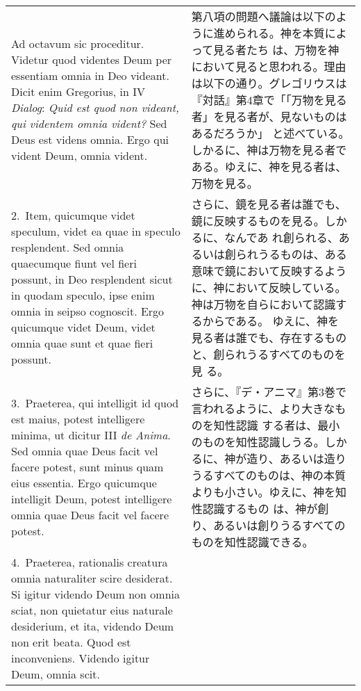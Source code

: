 \documentclass[10pt]{jsarticle} %
\begin{document}
\begin{longtable}{p{21em}p{21em}}

{\sc Ad octavum sic proceditur}. Videtur quod videntes Deum per
essentiam omnia in Deo videant. Dicit enim Gregorius, in IV {\it
Dialog}: {\it Quid est quod non videant, qui videntem omnia vident?}
Sed Deus est videns omnia. Ergo qui vident Deum, omnia vident.

&

第八項の問題へ議論は以下のように進められる。神を本質によって見る者たち
は、万物を神において見ると思われる。理由は以下の通り。グレゴリウスは
『対話』第4章で「「万物を見る者」を見る者が、見ないものはあるだろうか」
と述べている。しかるに、神は万物を見る者である。ゆえに、神を見る者は、
万物を見る。

\\

2.~{\sc Item}, quicumque videt speculum, videt ea quae in speculo
resplendent. Sed omnia quaecumque fiunt vel fieri possunt, in Deo
resplendent sicut in quodam speculo, ipse enim omnia in seipso
cognoscit. Ergo quicumque videt Deum, videt omnia quae sunt et quae
fieri possunt.

&

さらに、鏡を見る者は誰でも、鏡に反映するものを見る。しかるに、なんであ
れ創られる、あるいは創られうるものは、ある意味で鏡において反映するよう
に、神において反映している。神は万物を自らにおいて認識するからである。
ゆえに、神を見る者は誰でも、存在するものと、創られうるすべてのものを見
る。

\\

3.~{\sc Praeterea}, qui intelligit id quod est maius, potest
intelligere minima, ut dicitur III {\it de Anima}. Sed omnia quae Deus
facit vel facere potest, sunt minus quam eius essentia. Ergo quicumque
intelligit Deum, potest intelligere omnia quae Deus facit vel facere
potest.

&

さらに、『デ・アニマ』第3巻で言われるように、より大きなものを知性認識
する者は、最小のものを知性認識しうる。しかるに、神が造り、あるいは造り
うるすべてのものは、神の本質よりも小さい。ゆえに、神を知性認識するもの
は、神が創り、あるいは創りうるすべてのものを知性認識できる。

\\

4.~{\sc Praeterea}, rationalis creatura omnia naturaliter scire
desiderat. Si igitur videndo Deum non omnia sciat, non quietatur eius
naturale desiderium, et ita, videndo Deum non erit beata. Quod est
inconveniens. Videndo igitur Deum, omnia scit.


\end{longtable}
\end{document}
